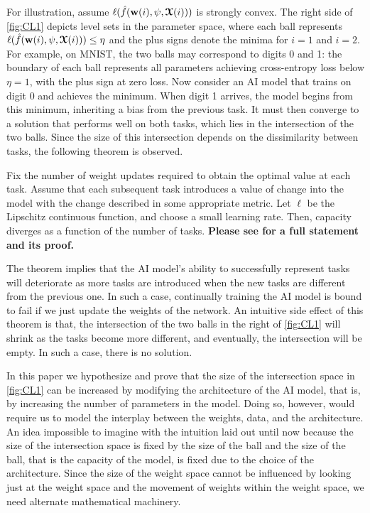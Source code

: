 For illustration, assume $\ell(\hat{f}(\boldsymbol{\mathrm{w}}(i), \psi, \boldsymbol{\mathcal{X}}(i)))$ is strongly convex. The right side of \cref{fig:CL1} depicts level sets in the parameter space, where each ball represents $\ell(\hat{f}(\boldsymbol{\mathrm{w}}(i), \psi, \boldsymbol{\mathcal{X}}(i))) \leq \eta$ and the plus signs denote the minima for $i=1$ and $i=2$. For example, on MNIST, the two balls may correspond to digits 0 and 1: the boundary of each ball represents all parameters achieving cross-entropy loss below $\eta=1$, with the plus sign at zero loss. Now consider an AI model that trains on digit 0 and achieves the minimum. When digit 1 arrives, the model begins from this minimum, inheriting a bias from the previous task. It must then converge to a solution that performs well on both tasks, which lies in the intersection of the two balls. Since the size of this intersection depends on the dissimilarity between tasks, the following theorem is observed.

\begin{theorem} 
\label{thm:task_nonstationary_weights}
 Fix the number of weight updates required to obtain the optimal value at each task. Assume that each subsequent task introduces a value of change into the model with the change described in some appropriate metric. Let $\ell$ be the Lipschitz continuous function, and choose a small learning rate. Then, capacity diverges as a function of the number of tasks.
 \textbf{Please see \cite{chakraborty2025understanding} for a full statement and its proof.}
\end{theorem}

The theorem implies that the AI model's ability to successfully represent tasks will deteriorate as more tasks are introduced when the new tasks are different from the previous one. In such a case, continually training the AI model is bound to fail if we just update the weights of the network. An intuitive side effect of this theorem is that, the intersection of the two balls in the right of \cref{fig:CL1} will shrink as the tasks become more different, and eventually, the intersection will be empty. In such a case, there is no solution.

In this paper we hypothesize and prove that the size of the intersection space in \cref{fig:CL1} can be increased by modifying the architecture of the AI model, that is, by increasing the number of parameters in the model. Doing so, however, would require us to model the interplay between the weights, data, and the architecture. An idea impossible to imagine with the intuition laid out until now because the size of the intersection space is fixed by the size of the ball and the size of the ball, that is the capacity  of the model, is fixed due to the choice of the architecture. Since the size of the weight space cannot be influenced by looking just at the weight space and the movement of weights within the weight space, we need alternate mathematical machinery. 

